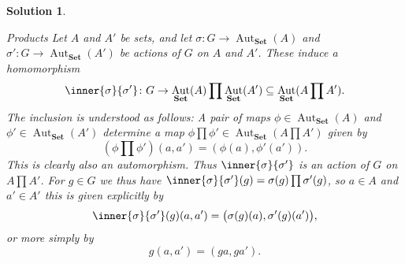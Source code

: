 \documentclass[article, a4paper, 11pt, oneside]{memoir}
\numberwithin{equation}{chapter}
\newcommand{\ncat}[1]{\mathbf{#1}} %
\newcommand{\catSet}{\ncat{Set}} %
\theoremstyle{nonumberplain}
\newtheorem{solution}{Solution}
\DeclareMathOperator{\Aut}{Aut}
\begin{document}
\begin{solution}
\begin{proofsec}
    \item[Products]
    Let $A$ and $A'$ be sets, and let $\sigma \colon G \to \Aut_\catSet(A)$ and $\sigma' \colon G \to \Aut_\catSet(A')$ be actions of $G$ on $A$ and $A'$. These induce a homomorphism
    \begin{equation*}
        \inner{\sigma}{\sigma'} \colon G
            \to \Aut_\catSet(A) \prod \Aut_\catSet(A')
            \subseteq \Aut_\catSet(A \prod A').
    \end{equation*}
    The inclusion is understood as follows: A pair of maps $\phi \in \Aut_\catSet(A)$ and $\phi' \in \Aut_\catSet(A')$ determine a map $\phi \prod \phi' \in \Aut_\catSet(A \prod A')$ given by
    \begin{equation*}
        (\phi \prod \phi')(a,a')
            = (\phi(a), \phi'(a')).
    \end{equation*}
    This is clearly also an automorphism. Thus $\inner{\sigma}{\sigma'}$ is an action of $G$ on $A \prod A'$. For $g \in G$ we thus have $\inner{\sigma}{\sigma'}(g) = \sigma(g) \prod \sigma'(g)$, so $a \in A$ and $a' \in A'$ this is given explicitly by
    \begin{equation*}
        \inner{\sigma}{\sigma'}(g)(a,a')
            = \bigl( \sigma(g)(a), \sigma'(g)(a') \bigr),
    \end{equation*}
    or more simply by
    \begin{equation*}
        g(a,a')
            = (ga, ga').
    \end{equation*}


\end{proofsec}
\end{solution}
\end{document}
